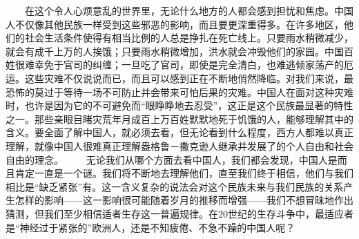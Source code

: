 \documentclass[12pt,oneside]{book}
\begin{document}
\begin{common-format}
　　在这个令人心烦意乱的世界里，无论什么地方的人都会感到担忧和焦虑。中国人不仅像其他民族一样受到这些邪恶的影响，而且要更深重得多。在许多地区，他们的社会生活条件使得有相当比例的人总是挣扎在死亡线上。只要雨水稍微减少，就会有成千上万的人挨饿；只要雨水稍微增加，洪水就会冲毁他们的家园。中国百姓很难幸免于官司的纠缠；一旦吃了官司，即使是完全清白，也难逃倾家荡产的厄运。这些灾难不仅说说而已，而且可以感到正在不断地俏然降临。对我们来说，最恐怖的莫过于等待一场不可防止并会带来可怕后果的灾难。中国人在面对这种灾难时，也许是因为它的不可避免而“眼睁睁地去忍受”，这正是这个民族最显著的特性之一。那些亲眼目睹灾荒年月成百上万百姓默默地死于饥饿的人，能够理解其中的含义。要全面了解中国人，就必须去看，但无论看到什么程度，西方人都难以真正理解，就像中国人很难真正理解盎格鲁－撒克逊人继承并发展了的个人自由和社会自由的理念。 
　　无论我们从哪个方面去看中国人，我们都会发现，中国人是而且肯定一直是一个谜。我们将不断地去理解他们，直至我们终于相信，他们与我们相比是“缺乏紧张”有。这一含义复杂的说法会对这个民族未来与我们民族的关系产生怎样的影响——这一影响很可能随着岁月的推移而增强——我们不想冒昧地作出猜测，但我们至少相信适者生存这一普遍规律。在20世纪的生存斗争中，最适应者是“神经过于紧张的”欧洲人，还是不知疲倦、不急不躁的中国人呢？ 


\end{common-format}
\end{document}
